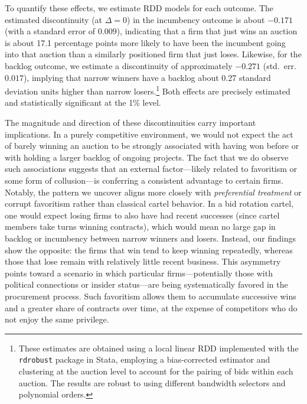 To quantify these effects, we estimate RDD models for each outcome. The estimated discontinuity (at $\Delta = 0$) in the incumbency outcome is about $-0.171$ (with a standard error of $0.009$), indicating that a firm that just wins an auction is about 17.1 percentage points more likely to have been the incumbent going into that auction than a similarly positioned firm that just loses. Likewise, for the backlog outcome, we estimate a discontinuity of approximately $-0.271$ (std.~err.~$0.017$), implying that narrow winners have a backlog about 0.27 standard deviation units higher than narrow losers.\footnote{These estimates are obtained using a local linear RDD implemented with the \texttt{rdrobust} package in Stata, employing a bias-corrected estimator and clustering at the auction level to account for the pairing of bids within each auction. The results are robust to using different bandwidth selectors and polynomial orders.} Both effects are precisely estimated and statistically significant at the 1\% level. 

The magnitude and direction of these discontinuities carry important implications. In a purely competitive environment, we would not expect the act of barely winning an auction to be strongly associated with having won before or with holding a larger backlog of ongoing projects. The fact that we do observe such associations suggests that an external factor—likely related to favoritism or some form of collusion—is conferring a consistent advantage to certain firms. Notably, the pattern we uncover aligns more closely with \textit{preferential treatment} or corrupt favoritism rather than classical cartel behavior. In a bid rotation cartel, one would expect losing firms to also have had recent successes (since cartel members take turns winning contracts), which would mean no large gap in backlog or incumbency between narrow winners and losers. Instead, our findings show the opposite: the firms that win tend to keep winning repeatedly, whereas those that lose remain with relatively little recent business. This asymmetry points toward a scenario in which particular firms—potentially those with political connections or insider status—are being systematically favored in the procurement process. Such favoritism allows them to accumulate successive wins and a greater share of contracts over time, at the expense of competitors who do not enjoy the same privilege.
